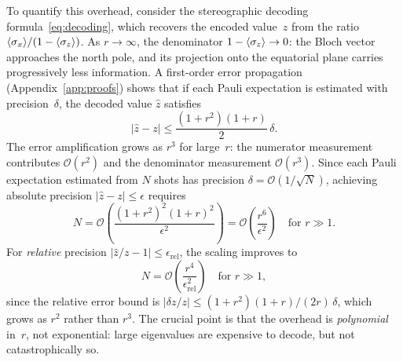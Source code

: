 To quantify this overhead, consider the stereographic decoding
formula~\eqref{eq:decoding}, which recovers the encoded value~$z$
from the ratio
$\langle\sigma_x\rangle/(1 - \langle\sigma_z\rangle)$.
As $r \to \infty$, the denominator
$1 - \langle\sigma_z\rangle \to 0$: the Bloch vector approaches
the north pole, and its projection onto the equatorial plane
carries progressively less information.  A first-order error
propagation (Appendix~\ref{app:proofs}) shows that if each Pauli
expectation is estimated with precision~$\delta$, the decoded
value $\hat{z}$ satisfies
\begin{equation}
	|\hat{z} - z| \leq \frac{(1+r^2)(1+r)}{2}\,\delta.
	\label{eq:error-bound}
\end{equation}
The error amplification grows as $r^3$ for large~$r$: the
numerator measurement contributes $\mathcal{O}(r^2)$ and the
denominator measurement $\mathcal{O}(r^3)$.  Since each Pauli
expectation estimated from $N$ shots has precision
$\delta = \mathcal{O}(1/\sqrt{N})$, achieving absolute precision
$|\hat{z} - z| \leq \epsilon$ requires
\begin{equation}
	N = \mathcal{O}\!\left(\frac{(1+r^2)^2(1+r)^2}{\epsilon^2}\right) = \mathcal{O}\!\left(\frac{r^6}{\epsilon^2}\right) \quad \text{for } r \gg 1.
	\label{eq:shot-count}
\end{equation}
For \emph{relative} precision
$|\hat{z}/z - 1| \leq \epsilon_{\mathrm{rel}}$, the scaling
improves to
\begin{equation}
	N = \mathcal{O}\!\left(\frac{r^4}{\epsilon_{\mathrm{rel}}^2}\right) \quad \text{for } r \gg 1,
	\label{eq:shot-count-rel}
\end{equation}
since the relative error bound is
$|\delta z/z| \leq (1+r^2)(1+r)/(2r)\,\delta$, which grows as
$r^2$ rather than $r^3$.  The crucial point is that the overhead
is \emph{polynomial} in~$r$, not exponential: large eigenvalues
are expensive to decode, but not catastrophically so.


